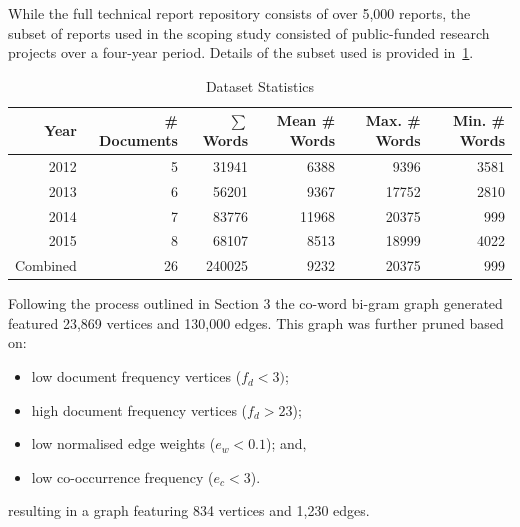 \documentclass[a4paper, 11pt]{article}
\begin{document}
While the full technical report repository consists of over 5,000 reports, the subset of reports used in the scoping study consisted of public-funded research projects over a four-year period. Details of the subset used is provided in~\cref{tbl:dataset}.

\begin{table}[h!]
  \center
  \caption{Dataset Statistics}
  \label{tbl:dataset}
  \footnotesize
  \begin{tabular}{*{6}r}
    \toprule
    \textbf{Year} & \textbf{\# Documents} & \textbf{$\sum$ Words} & \textbf{Mean \# Words} & \textbf{Max. \# Words} & \textbf{Min. \# Words} \\
    \midrule
    2012 & 5 & \num{31941} & \num{6388} & \num{9396} & \num{3581} \\
    2013 & 6 & \num{56201} & \num{9367} & \num{17752} & \num{2810} \\
    2014 & 7 & \num{83776} & \num{11968} & \num{20375} & \num{999} \\
    2015 & 8 & \num{68107} & \num{8513} & \num{18999} & \num{4022} \\
    \midrule
    Combined & 26 & \num{240025} & \num{9232} & \num{20375} & \num{999} \\
    \bottomrule
  \end{tabular}
\end{table}

Following the process outlined in Section 3 the co-word bi-gram graph generated featured 23,869 vertices and 130,000 edges. This graph was further pruned based on: 

\begin{itemize}
  \item low document frequency vertices ($f_d<3)$; 
  \item high document frequency vertices ($f_d>23$);
  \item low normalised edge weights ($e_w<0.1$); and,
  \item low co-occurrence frequency ($e_c<3$).
\end{itemize}

resulting in a graph featuring 834 vertices and 1,230 edges.
\end{document}
